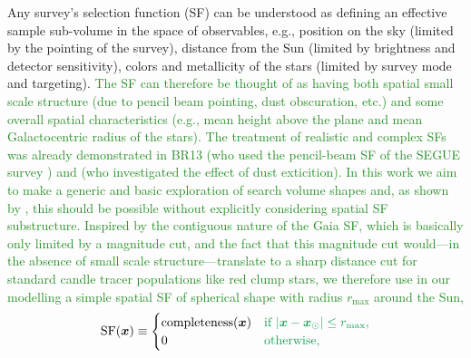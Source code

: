 \documentclass[iop,revtex4]{emulateapj}
\newcommand{\vect}[1]{\boldsymbol{#1}}
\newcommand{\NEW}[1]{\textcolor{ForestGreen}{#1}}
\newcommand{\OLD}[1]{}
\begin{document}
\begin{appendix}
Any survey's selection function (SF) can be understood as defining an effective sample sub-volume in the space of observables, e.g., position on the sky (limited by the pointing of the survey), distance from the Sun (limited by brightness and detector sensitivity), colors and metallicity of the stars (limited by survey mode and targeting). \NEW{The SF can therefore be thought of as having both spatial small scale structure (due to pencil beam pointing, dust obscuration, etc.) and some overall spatial characteristics (e.g., mean height above the plane and mean Galactocentric radius of the stars). The treatment of realistic and complex SFs was already demonstrated in BR13 (who used the pencil-beam SF of the SEGUE survey \citep{2012ApJ...753..148B}) and \citet{2016ApJ...818..130B} (who investigated the effect of dust exticition). In this work we aim to make a generic and basic exploration of search volume shapes and, as shown by \citet{2016ApJ...818..130B}, this should be possible without explicitly considering spatial SF substructure. Inspired by the contiguous nature of the Gaia SF, which is basically only limited by a magnitude cut, and the fact that this magnitude cut would---in the absence of small scale structure---translate to a sharp distance cut for standard candle tracer populations like red clump stars, we therefore use in our modelling a simple spatial SF of spherical shape with radius $r_\text{max}$ around the Sun,} \OLD{In our modelling we use simple spatial SFs, describes the probability to observe a star at position $\vect{x}$,}
\begin{eqnarray}
\text{SF}(\vect{x}) \equiv \begin{cases}
\text{completeness}(\vect{x}) &\text{\OLD{if $\vect{x}$ within obs. volume,}\NEW{if $|\vect{x}-\vect{x}_\odot| \leq r_\text{max}$,}}\\
0 & \text{\OLD{if $\vect{x}$ outside.}\NEW{otherwise,}}
\end{cases} \label{eq:selectionfunction}
\end{eqnarray}


\end{appendix}
\end{document}
